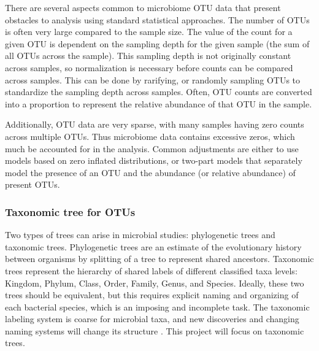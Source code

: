 \documentclass[12pt]{article}
\begin{document}
There are several aspects common to microbiome OTU data that present obstacles to analysis using standard statistical approaches. The number of OTUs is often very large compared to the sample size. The value of the count for a given OTU is dependent on the sampling depth for the given sample (the sum of all OTUs across the sample). This sampling depth is not originally constant across samples, so  normalization is necessary before counts can be compared across samples. This can be done by rarifying, or randomly sampling OTUs to standardize the sampling depth across samples. Often, OTU counts are converted into a proportion to represent the relative abundance of that OTU in the sample.


Additionally, OTU data are very sparse, with many samples having zero counts across multiple OTUs. Thus microbiome data contains excessive zeros, which much be accounted for in the analysis. Common adjustments are either to use models based on zero inflated distributions, or two-part models that separately model the presence of an OTU and the abundance (or relative abundance) of present OTUs.





%


\subsubsection{Taxonomic tree for OTUs}

Two types of trees can arise in microbial studies: phylogenetic trees and taxonomic trees. Phylogenetic trees  are an estimate of the evolutionary history between organisms by splitting of a tree to represent shared ancestors. Taxonomic trees represent the hierarchy of shared labels of different classified taxa levels: Kingdom, Phylum, Class, Order, Family, Genus, and Species. Ideally, these two trees should be equivalent, but this requires explicit naming and organizing of each bacterial species, which is an imposing and incomplete task. The taxonomic labeling system is coarse for microbial taxa, and new discoveries and changing naming systems will change its structure \cite{washburne2018methods}. This project will focus on taxonomic trees.
\end{document}

